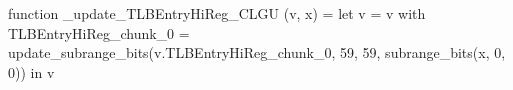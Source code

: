 function _update_TLBEntryHiReg_CLGU (v, x) = let v = { v with TLBEntryHiReg_chunk_0 = update_subrange_bits(v.TLBEntryHiReg_chunk_0, 59, 59, subrange_bits(x, 0, 0)) } in
  v
